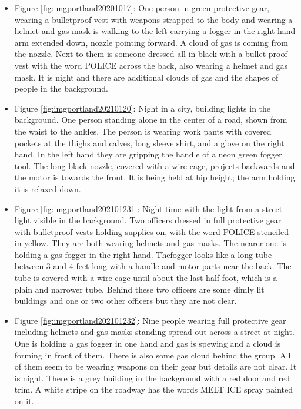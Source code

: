 \documentclass[
  11pt,
]{krantz}
\begin{document}
\begin{itemize}
\item
  Figure \ref{fig:imgportland20201017}: One person in green protective gear, wearing a bulletproof vest with weapons strapped to the body and wearing a helmet and gas mask is walking to the left carrying a fogger in the right hand arm extended down, nozzle pointing forward. A cloud of gas is coming from the nozzle. Next to them is someone dressed all in black with a bullet proof vest with the word POLICE across the back, also wearing a helmet and gas mask. It is night and there are additional clouds of gas and the shapes of people in the background.
\item
  Figure \ref{fig:imgportland20210120}: Night in a city, building lights in the background. One person standing alone in the center of a road, shown from the waist to the ankles. The person is wearing work pants with covered pockets at the thighs and calves, long sleeve shirt, and a glove on the right hand. In the left hand they are gripping the handle of a neon green fogger tool. The long black nozzle, covered with a wire cage, projects backwards and the motor is towards the front. It is being held at hip height; the arm holding it is relaxed down.
\item
  Figure \ref{fig:imgportland202101231}: Night time with the light from a street light visible in the background. Two officers dressed in full protective gear with bulletproof vests holding supplies on, with the word POLICE stenciled in yellow. They are both wearing helmets and gas masks. The nearer one is holding a gas fogger in the right hand. Thefogger looks like a long tube between 3 and 4 feet long with a handle and motor parts near the back. The tube is covered with a wire cage until about the last half foot, which is a plain and narrower tube. Behind these two officers are some dimly lit buildings and one or two other officers but they are not clear.
\item
  Figure \ref{fig:imgportland202101232}: Nine people wearing full protective gear including helmets and gas masks standing spread out across a street at night. One is holding a gas fogger in one hand and gas is spewing and a cloud is forming in front of them. There is also some gas cloud behind the group. All of them seem to be wearing weapons on their gear but details are not clear. It is night. There is a grey building in the background with a red door and red trim. A white stripe on the roadway has the words MELT ICE spray painted on it.
\end{itemize}
\end{document}
